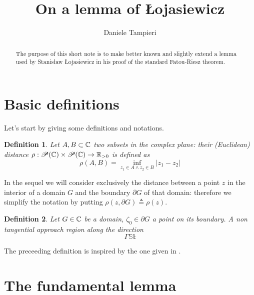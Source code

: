 \documentclass[a4paper,10pt]{article}
\title{On a lemma of Łojasiewicz}
\author{Daniele Tampieri}
\date{}
\newcommand{\St}{\mathbb{St}}
\newtheorem{defn}{Definition}
\begin{document}
\maketitle
\begin{abstract}
  The purpose of this short note is to make better known and slightly extend a lemma used by Stanisław Łojasiewicz in his proof of the standard Fatou-Riesz theorem.
\end{abstract}
\section{Basic definitions}
Let's start by giving some definitions and notations.
\begin{defn} Let $A,B\subset \Bbb C$ two subsets in the complex plane: their \emph{(Euclidean) distance} $\rho:\mathscr{P}(\Bbb C)\times\mathscr{P}(\Bbb C)\to\Bbb R_{>0}$ is defined as
  \begin{equation*}\label{eq:dist}
    \rho(A,B)=\inf_{z_1\in A \wedge z_2\in B}|z_1-z_2|
  \end{equation*}
\end{defn}
In the sequel we will consider exclusively the distance between a point $z$ in the interior of a domain $G$ and the boundary $\partial G$ of that domain: therefore we simplify the notation by putting $\rho(z,\partial G)\triangleq \rho(z)$.
\begin{defn} Let $G\in\Bbb C$ be a domain, $\zeta_0 \in\partial G$ a point on its boundary. A non tangential approach region along the direction
  \begin{equation}\label{eq:appreg}
    \Gamma\St
  \end{equation}
\end{defn}
The preceeding definition is inspired by the one given in {\rm\cite[§1.1, p.~8]{DiBiase1998}}.

\section{The fundamental lemma}
\end{document}
